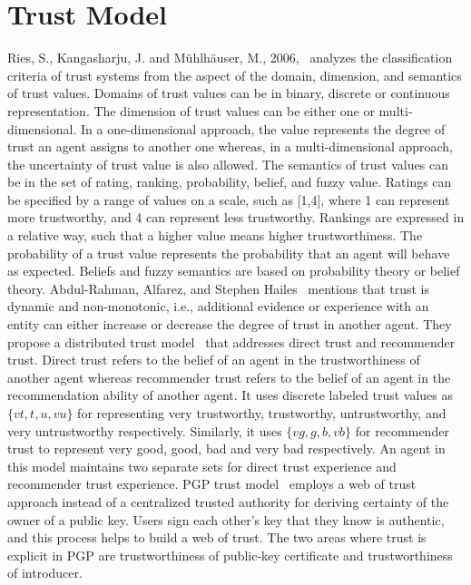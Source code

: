 \section{Trust Model}
Ries, S., Kangasharju, J. and Mühlhäuser, M.,
2006,~\cite{ries2006classification} analyzes the classification criteria of
trust systems from the aspect of the domain, dimension, and semantics of trust
values. Domains of trust values can be in binary, discrete or continuous
representation. The dimension of trust values can be either one or
multi-dimensional. In a one-dimensional approach, the value represents the
degree of trust an agent assigns to another one whereas, in a multi-dimensional
approach, the uncertainty of trust value is also allowed. The semantics of
trust values can be in the set of rating, ranking, probability, belief, and fuzzy
value. Ratings can be specified by a range of values on a scale, such as [1,4],
where 1 can represent more trustworthy, and 4 can represent less trustworthy.
Rankings are expressed in a relative way, such that a higher value means higher
trustworthiness. The probability of a trust value represents the probability
that an agent will behave as expected. Beliefs and fuzzy semantics are based on
probability theory or belief theory. Abdul-Rahman, Alfarez, and Stephen
Hailes~\cite{abdul2000supporting} mentions that trust is dynamic and
non-monotonic, i.e., additional evidence or experience with an entity can
either increase or decrease the degree of trust in another agent. They propose
a distributed trust model~\cite{abdul1998distributed} that addresses direct
trust and recommender trust. Direct trust refers to the belief of an agent in
the trustworthiness of another agent whereas recommender trust refers to the
belief of an agent in the recommendation ability of another agent. It uses
discrete labeled trust values as $\{vt, t, u, vu\}$ for representing very
trustworthy, trustworthy, untrustworthy, and very untrustworthy respectively.
Similarly, it uses $\{vg, g, b, vb\}$ for recommender trust to represent very
good, good, bad and very bad respectively. An agent in this model maintains two
separate sets for direct trust experience and recommender trust experience. PGP
trust model~\cite{abdul1997pgp} employs a web of trust approach instead of a
centralized trusted authority for deriving certainty of the owner of a public
key. Users sign each other's key that they know is authentic, and this process
helps to build a web of trust. The two areas where trust is explicit in PGP are
trustworthiness of public-key certificate and trustworthiness of introducer.
